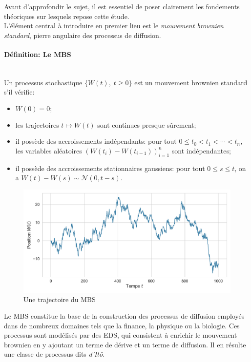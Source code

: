 Avant d'approfondir le sujet, il est essentiel de poser clairement les fondements théoriques sur lesquels repose cette étude.\\
L'élément central à introduire en premier lieu est le \textit{mouvement brownien standard}, pierre angulaire des processus de diffusion.

\paragraph{Définition: Le \acl{MBS}}\mbox{}\\ 
Un processus stochastique $\{W(t),\;t\geq0\}$ est un mouvement brownien standard s'il vérifie:
\begin{itemize}
    \item $W(0) = 0$;
    \item les trajectoires $t \mapsto W(t)$ sont continues presque sûrement;
    \item il possède des accroissements indépendants: pour tout $0 \leq t_0 < t_1 < \cdots < t_n$, les variables aléatoires ${\left(W(t_i) - W(t_{i-1})\right)}_{i=1}^n$ sont indépendantes;
    \item il possède des accroissements stationnaires gaussiens: pour tout $0 \leq s \leq t$, on a $W(t) - W(s) \sim \mathcal{N}(0, t - s)$.
\end{itemize}
\begin{figure}[htb]
    \centering
    \includegraphics[width=\linewidth]{img/intro/path_MBS.pdf}
    \caption{Une trajectoire du \acl{MBS}}\label{fig:TrajMBS}
\end{figure}
\FloatBarrier Le \acs{MBS} constitue la base de la construction des processus de diffusion employés dans de nombreux domaines tels que la finance, la physique ou la biologie. Ces processus sont modélisés par des \acf{EDS}, qui consistent à enrichir le mouvement brownien en y ajoutant un terme de dérive et un terme de diffusion. Il en résulte une classe de processus dits \textit{d'Itô}.

